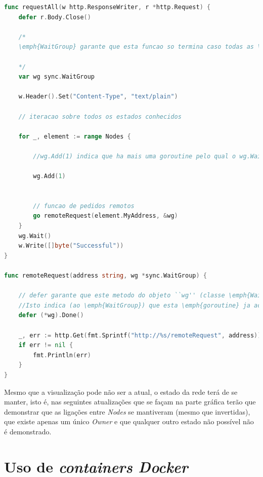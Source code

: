 \begin{lstlisting}[caption={Iteração pelo ``Map'' ``Nodes'', instanciação do objeto e adicionado à lista },language=Go]
func requestAll(w http.ResponseWriter, r *http.Request) {
	defer r.Body.Close()

	/* 
	\emph{WaitGroup} garante que esta funcao so termina caso todas as \emph{goroutines} terminem de executar.

	*/
	var wg sync.WaitGroup

	w.Header().Set("Content-Type", "text/plain")

	// iteracao sobre todos os estados conhecidos

	for _, element := range Nodes {

		//wg.Add(1) indica que ha mais uma goroutine pelo qual o wg.Wait() precisa de esperar

		wg.Add(1)


		// funcao de pedidos remotos
		go remoteRequest(element.MyAddress, &wg)
	}
	wg.Wait()
	w.Write([]byte("Successful"))
}

func remoteRequest(address string, wg *sync.WaitGroup) {

	// defer garante que este metodo do objeto ``wg'' (classe \emph{WaitGroup}) e executado
	//Isto indica (ao \emph{WaitGroup}) que esta \emph{goroutine} ja acabou a execucao
	defer (*wg).Done()

	_, err := http.Get(fmt.Sprintf("http://%s/remoteRequest", address))
	if err != nil {
		fmt.Println(err)
	}
}

\end{lstlisting}

Mesmo que a visualização pode não ser a atual, o estado da rede terá de se manter, isto é, nas seguintes 
atualizações que se façam na parte gráfica terão que demonstrar que as ligações entre \emph{Nodes} se mantiveram (mesmo que invertidas), que existe apenas um único \emph{Owner} e que qualquer outro estado não possível não é demonstrado.






\section{Uso de \emph{containers Docker}}


